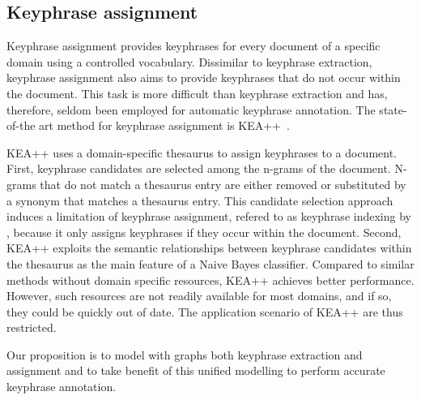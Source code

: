 
    \subsection{Keyphrase assignment}
    \label{subsec:aka}
        Keyphrase assignment provides keyphrases for every document of a specific domain using a controlled vocabulary. Dissimilar to keyphrase extraction, keyphrase assignment also
    aims to provide keyphrases that do not occur within the document. This task is more
    difficult than keyphrase extraction and has, therefore, seldom been employed for automatic
    keyphrase annotation.  The state-of-the art method for keyphrase assignment is KEA++~\cite{medelyan2006kea++}.

        KEA++ uses a domain-specific thesaurus to assign keyphrases to a document.
        First, keyphrase candidates are selected among the n-grams of the document.
        N-grams that do not match a thesaurus entry are either removed or substituted by a synonym that matches a thesaurus entry.
        This candidate selection approach induces a limitation of keyphrase assignment, refered to as keyphrase indexing by , because it only assigns keyphrases if they occur within the document.
        Second, KEA++ exploits the semantic relationships between keyphrase candidates within the thesaurus as the main feature of a Naive Bayes classifier.
        Compared to similar methods without domain specific resources, KEA++ achieves better performance.
        However, such resources are not readily available for most domains, and if so, they could be quickly out of date. 
        The application scenario of KEA++ are thus restricted.
    
  Our proposition is to model  with graphs both keyphrase extraction and assignment and to take benefit of this unified modelling to perform accurate keyphrase annotation. 